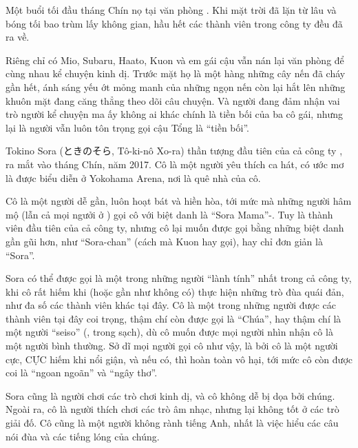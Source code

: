 \documentclass[../main.tex]{subfiles}
\begin{document}


Một buổi tối đầu tháng Chín nọ tại văn phòng \hll. Khi mặt trời đã lặn từ lâu và bóng tối bao trùm lấy không gian, hầu hết các thành viên trong công ty đều đã ra về.

Riêng chỉ có Mio, Subaru, Haato, Kuon và em gái cậu vẫn nán lại văn phòng để cùng nhau kể chuyện kinh dị. Trước mặt họ là một hàng những cây nến đã cháy gần hết, ánh sáng yếu ớt mỏng manh của những ngọn nến còn lại hắt lên những khuôn mặt đang căng thẳng theo dõi câu chuyện. Và người đang đảm nhận vai trò người kể chuyện ma ấy không ai khác chính là tiền bối của ba cô gái, nhưng lại là người vẫn luôn tôn trọng gọi cậu Tổng là ``tiền bối''.

\chrint

Tokino Sora (ときのそら, Tô-ki-nô Xo-ra) thần tượng đầu tiên của cả công ty \hll, ra mắt vào tháng Chín, năm 2017. Cô là một người yêu thích ca hát, có ước mơ là được biểu diễn ở Yokohama Arena, nơi là quê nhà của cô.

Cô là một người dễ gần, luôn hoạt bát và hiền hòa, tới mức mà những người hâm mộ (lẫn cả mọi ngưởi ở \hll) gọi cô với biệt danh là ``Sora Mama''-. Tuy là thành viên đầu tiên của cả công ty, nhưng cô lại muốn được gọi bằng những biệt danh gần gũi hơn, như ``Sora-chan'' (cách mà Kuon hay gọi), hay chỉ đơn giản là ``Sora''.

Sora có thể được gọi là một trong những người ``lành tính'' nhất trong cả công ty, khi cô rất hiếm khi (hoặc gần như không có) thực hiện những trò đùa quái đản, như đa số các thành viên khác tại đây. Cô là một trong những người được các thành viên tại đây coi trọng, thậm chí còn được gọi là ``Chúa'', hay thậm chí là một người ``seiso'' (, trong sạch), dù cô muốn được mọi người nhìn nhận cô là một người bình thường. Sở dĩ mọi người gọi cô như vậy, là bởi cô là một người cực, CỰC hiếm khi nổi giận, và nếu có, thì hoàn toàn vô hại, tới mức cô còn được coi là ``ngoan ngoãn'' và ``ngây thơ''.

Sora cũng là người chơi các trò chơi kinh dị, và cô không dễ bị dọa bởi chúng. Ngoài ra, cô là người thích chơi các trò âm nhạc, nhưng lại không tốt ở các trò giải đố. Cô cũng là một người không rành tiếng Anh, nhất là việc hiểu các câu nói đùa và các tiếng lóng của chúng.
\end{document}
